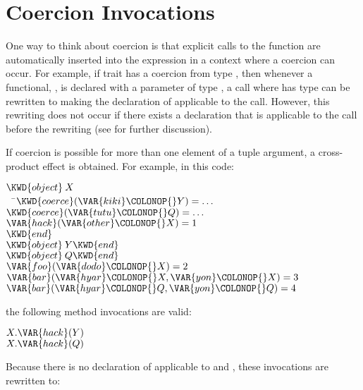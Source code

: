 \section{Coercion Invocations}

One way to think about coercion is that explicit calls to the
function are automatically inserted into the expression in a context
where a coercion can occur.  For example, if trait  has a coercion
from type , then whenever a functional, , is declared
with a parameter of type , a call  where  has
type  can be rewritten to
making the declaration of  applicable to the call.  However, this
rewriting does not occur if there exists a declaration that is
applicable to the call before the rewriting (see
 for further discussion).

If coercion is possible for more than one element of a tuple
argument, a cross-product effect is obtained.  For example, in this code:


\begin{Fortress}
\(\KWD{object}\:X\)\\
{\tt~~}\pushtabs\=\+\(  \KWD{coerce}(\VAR{kiki}\COLONOP{}Y) = \ldots\)\\
\(  \KWD{coerce}(\VAR{tutu}\COLONOP{}Q) = \ldots\)\\
\(  \VAR{hack}(\VAR{other}\COLONOP{}X) = 1\)\-\\\poptabs
\(\KWD{end}\)\\
\(\KWD{object}\:Y \KWD{end}\)\\
\(\KWD{object}\:Q \KWD{end}\)\\[4pt]
\(\VAR{foo}(\VAR{dodo}\COLONOP{}X) = 2\)\\[4pt]
\(\VAR{bar}(\VAR{hyar}\COLONOP{}X, \VAR{yon}\COLONOP{}X) = 3\)\\
\(\VAR{bar}(\VAR{hyar}\COLONOP{}Q, \VAR{yon}\COLONOP{}Q) = 4\)
\end{Fortress}
the following method invocations are valid:
\begin{Fortress}
\(X.\VAR{hack}(Y)\)\\
\(X.\VAR{hack}(Q)\)
\end{Fortress}
Because there is no declaration of  applicable to  and
, these invocations are rewritten to:

